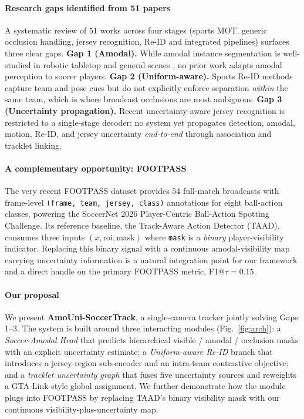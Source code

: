 \documentclass[conference]{IEEEtran}
\begin{document}
\paragraph*{Research gaps identified from 51 papers}
A systematic review of $51$ works across four stages (sports MOT, generic occlusion handling, jersey recognition, Re-ID and integrated pipelines) surfaces three clear gaps.
\textbf{Gap 1 (Amodal).} While amodal instance segmentation is well-studied in robotic tabletop \cite{uoais} and general scenes \cite{sameo, seqamodaldiff}, no prior work adapts amodal perception to soccer players.
\textbf{Gap 2 (Uniform-aware).} Sports Re-ID methods \cite{sportsreid, multitaskreid, pgfa} capture team and pose cues but do not explicitly enforce separation \emph{within} the same team, which is where broadcast occlusions are most ambiguous.
\textbf{Gap 3 (Uncertainty propagation).} Recent uncertainty-aware jersey recognition \cite{uncertaintyjersey} is restricted to a single-stage decoder; no system yet propagates detection, amodal, motion, Re-ID, and jersey uncertainty \emph{end-to-end} through association and tracklet linking.

\paragraph*{A complementary opportunity: FOOTPASS}
The very recent FOOTPASS dataset \cite{footpass} provides $54$ full-match broadcasts with frame-level \texttt{(frame, team, jersey, class)} annotations for eight ball-action classes, powering the SoccerNet 2026 Player-Centric Ball-Action Spotting Challenge. Its reference baseline, the Track-Aware Action Detector (TAAD), consumes three inputs $(x, \text{roi}, \text{mask})$ where \texttt{mask} is a \emph{binary} player-visibility indicator. Replacing this binary signal with a continuous amodal-visibility map carrying uncertainty information is a natural integration point for our framework and a direct handle on the primary FOOTPASS metric, F1@$\tau=0.15$.

\paragraph*{Our proposal}
We present \textbf{AmoUni-SoccerTrack}, a single-camera tracker jointly solving Gaps 1--3. The system is built around three interacting modules (Fig.~\ref{fig:arch}): a \emph{Soccer-Amodal Head} that predicts hierarchical visible / amodal / occlusion masks with an explicit uncertainty estimate; a \emph{Uniform-aware Re-ID} branch that introduces a jersey-region sub-encoder and an intra-team contrastive objective; and a \emph{tracklet uncertainty graph} that fuses five uncertainty sources and reweights a GTA-Link-style global assignment. We further demonstrate how the module plugs into FOOTPASS by replacing TAAD's binary visibility mask with our continuous visibility-plus-uncertainty map.
\end{document}
